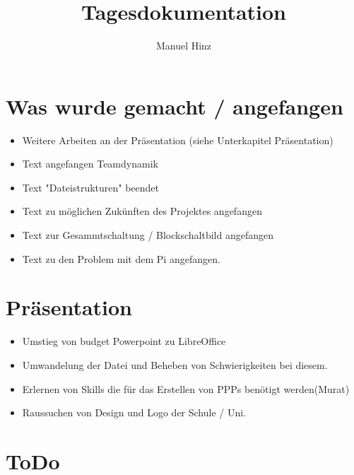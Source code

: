 \documentclass{article}
\author{Manuel Hinz}
\title{Tagesdokumentation}
\begin{document}
\maketitle

\section{Was wurde gemacht / angefangen}

\begin{itemize}

\item Weitere Arbeiten an der Präsentation (siehe Unterkapitel Präsentation)

\item Text angefangen Teamdynamik

\item Text "Dateistrukturen" beendet

\item Text zu möglichen Zukünften des Projektes angefangen

\item Text zur Gesammtschaltung / Blockschaltbild angefangen

\item Text zu den Problem mit dem Pi angefangen.

\end{itemize}

\section{Präsentation}

\begin{itemize}

\item Umstieg von budget Powerpoint zu LibreOffice

\item Umwandelung der Datei und Beheben von Schwierigkeiten bei diesem.

\item Erlernen von Skills die für das Erstellen von PPPs benötigt werden(Murat)

\item Raussuchen von Design und Logo der Schule / Uni.

\end{itemize}

\section{ToDo}
\end{document}
